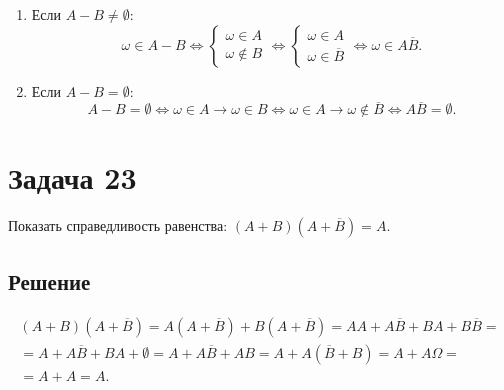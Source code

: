 \begin{enumerate}
    \item Если $A - B \neq \emptyset$:
    \begin{equation}
        \omega \in A - B
        \Leftrightarrow
        \left \{
        \begin{array}{l}
            \omega \in A \\
            \omega \notin B
        \end{array}
        \right .
        \Leftrightarrow
        \left \{
        \begin{array}{l}
            \omega \in A \\
            \omega \in \overline{B}
        \end{array}
        \right .
        \Leftrightarrow
        \omega \in A \overline{B} .
    \end{equation}

    \item Если $A - B = \emptyset$:
    \begin{equation}
        A - B = \emptyset
        \Leftrightarrow
        \omega \in A \rightarrow \omega \in B
        \Leftrightarrow
        \omega \in A \rightarrow \omega \notin \overline{B}
        \Leftrightarrow
        A \overline{B} = \emptyset .
    \end{equation}
\end{enumerate}


\section*{Задача 23}

Показать справедливость равенства: $\left ( A + B \right ) \left ( A + \overline{B} \right ) = A$.

\subsection*{Решение}

\begin{multline}
    \left ( A + B \right ) \left ( A + \overline{B} \right )
    = A \left ( A + \overline{B} \right ) + B \left ( A + \overline{B} \right )
    = A A + A \overline{B} + B A + B \overline{B} = \\
    = A + A \overline{B} + B A + \emptyset
    = A + A \overline{B} + A B
    = A + A \left ( \overline{B} + B \right )
    = A + A \Omega = \\
    = A + A
    = A
    .
\end{multline}


